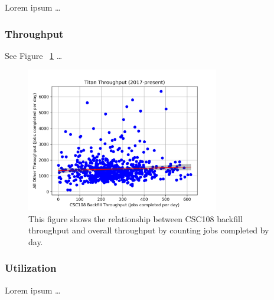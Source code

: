 Lorem ipsum \ldots






\subsubsection{Throughput}
\label{subsubsec:throughput}

See Figure ~\ref{fig:throughput-all} \ldots


\begin{figure}
  \includegraphics[width=0.75\textwidth]{images/linfit-throughput-all.png}
\caption{This figure shows the relationship between CSC108 backfill throughput
and overall throughput by counting jobs completed by day.}
\label{fig:throughput-all}
\end{figure}




\subsubsection{Utilization}
\label{subsubsec:utilization}

Lorem ipsum \ldots



